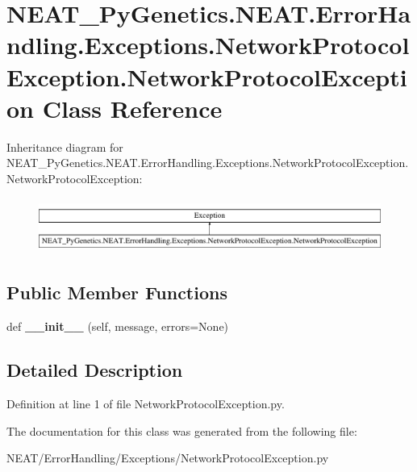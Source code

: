 \hypertarget{class_n_e_a_t___py_genetics_1_1_n_e_a_t_1_1_error_handling_1_1_exceptions_1_1_network_protocol_e188125698c575255a18f4dd8d98568df}{}\section{N\+E\+A\+T\+\_\+\+Py\+Genetics.\+N\+E\+A\+T.\+Error\+Handling.\+Exceptions.\+Network\+Protocol\+Exception.\+Network\+Protocol\+Exception Class Reference}
\label{class_n_e_a_t___py_genetics_1_1_n_e_a_t_1_1_error_handling_1_1_exceptions_1_1_network_protocol_e188125698c575255a18f4dd8d98568df}
Inheritance diagram for N\+E\+A\+T\+\_\+\+Py\+Genetics.\+N\+E\+A\+T.\+Error\+Handling.\+Exceptions.\+Network\+Protocol\+Exception.\+Network\+Protocol\+Exception\+:\begin{figure}[H]
\begin{center}
\leavevmode
\includegraphics[height=1.824104cm]{class_n_e_a_t___py_genetics_1_1_n_e_a_t_1_1_error_handling_1_1_exceptions_1_1_network_protocol_e188125698c575255a18f4dd8d98568df}
\end{center}
\end{figure}
\subsection*{Public Member Functions}
\begin{DoxyCompactItemize}
\item 
def {\bfseries \+\_\+\+\_\+init\+\_\+\+\_\+} (self, message, errors=None)\hypertarget{class_n_e_a_t___py_genetics_1_1_n_e_a_t_1_1_error_handling_1_1_exceptions_1_1_network_protocol_e188125698c575255a18f4dd8d98568df_a9d12de9b98da65c1a683fe038e066e49}{}\label{class_n_e_a_t___py_genetics_1_1_n_e_a_t_1_1_error_handling_1_1_exceptions_1_1_network_protocol_e188125698c575255a18f4dd8d98568df_a9d12de9b98da65c1a683fe038e066e49}

\end{DoxyCompactItemize}


\subsection{Detailed Description}


Definition at line 1 of file Network\+Protocol\+Exception.\+py.



The documentation for this class was generated from the following file\+:\begin{DoxyCompactItemize}
\item 
N\+E\+A\+T/\+Error\+Handling/\+Exceptions/Network\+Protocol\+Exception.\+py\end{DoxyCompactItemize}
